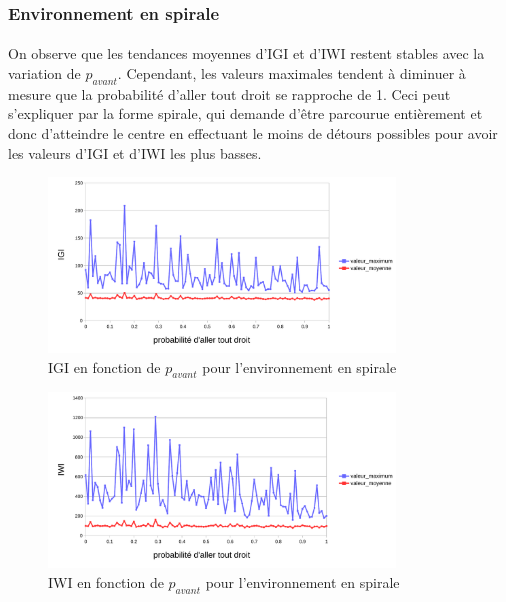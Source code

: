 \documentclass{article}
\begin{document}
    \subsubsection{Environnement en spirale}
    \paragraph{}On observe que les tendances moyennes d'IGI et d'IWI restent stables avec la variation de $p_{avant}$. Cependant, les valeurs maximales tendent à diminuer à mesure que la probabilité d'aller tout droit se rapproche de 1.
    Ceci peut s'expliquer par la forme spirale, qui demande d'être parcourue entièrement et donc d'atteindre le centre en effectuant le moins de détours possibles pour avoir les valeurs d'IGI et d'IWI les plus basses.
    \begin{figure}[!h]
        \begin{center}
            \includegraphics[width = 0.82\textwidth]{graphes pdf/variance go-ahead IGI spirale.pdf}
            \caption{IGI en fonction de $p_{avant}$ pour l'environnement en spirale}
        \end{center}
    \end{figure}
    \begin{figure}[!h]
        \begin{center}
            \includegraphics[width = 0.82\textwidth]{graphes pdf/variance go-ahead IWI spirale.pdf}
            \caption{IWI en fonction de $p_{avant}$ pour l'environnement en spirale}
        \end{center}
    \end{figure}
    \newpage
\end{document}
